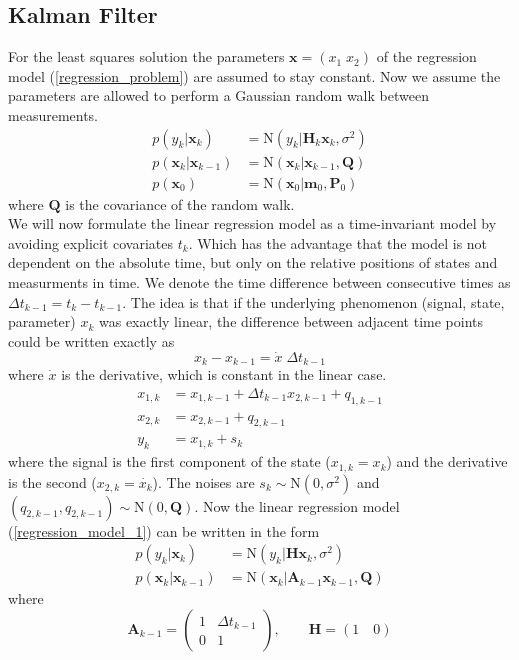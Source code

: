 \subsection{Kalman Filter} \label{KF}
For the least squares solution the parameters
$\mathbf{x} = (x_{1} \; x_{2})$ of
the regression model (\ref{regression_problem}) are assumed to stay constant.
Now we assume the parameters are allowed to perform
a Gaussian random walk between measurements.
\begin{align*}
  p(y_k | \mathbf{x}_k) &= \text{N}(y_k | \mathbf{H}_k \mathbf{x}_k, \sigma^2) \\
  p(\mathbf{x}_k | \mathbf{x}_{k-1}) &= \text{N}(\mathbf{x}_k |
                               \mathbf{x}_{k-1}, \mathbf{Q}) \\
  p(\mathbf{x}_0) &= \text{N}(\mathbf{x}_0 | \mathbf{m}_0, \mathbf{P}_0)
\end{align*}
where $\mathbf{Q}$ is the covariance of the random walk. \\
We will now formulate the
linear regression model as a time-invariant model
by avoiding explicit covariates $t_k$.
Which has the advantage that the model is not dependent on
the absolute time, but only on the relative positions of states
and measurments in time.
We denote the time difference between consecutive times as
$\Delta t_{k-1} = t_k - t_{k-1}$. The idea is that if
the underlying phenomenon (signal, state, parameter) $x_k$ was
exactly linear, the difference between adjacent time points could be
written exactly as
$$ x_k - x_{k-1} = \dot{x} \; \Delta t_{k-1} $$
where $\dot{x}$ is the derivative, which is constant in the linear case.
\begin{align*}
  x_{1,k} &= x_{1,k-1} + \Delta t_{k-1} x_{2,k-1} + q_{1,k-1} \\
  x_{2,k} &= x_{2,k-1} + q_{2,k-1} \\
  y_k &= x_{1,k} + s_k
\end{align*}
where the signal is the first component of the state
($x_{1,k} = x_k$) and the derivative is the second
($x_{2,k} = \dot{x_k}$).
The noises are $s_k \sim \text{N}(0, \sigma^2)$ and
$(q_{2,k-1}, q_{2,k-1}) \sim \text{N}(0,\mathbf{Q})$.
Now the linear regression model (\ref{regression_model_1}) can be written
in the form
\begin{align*}
  p(y_k | \mathbf{x}_k) &= \text{N}(y_k | \mathbf{H}
                          \mathbf{x}_k, \sigma^2) \\
  p(\mathbf{x}_k | \mathbf{x}_{k-1}) &= \text{N}(\mathbf{x}_k |
                                       \mathbf{A}_{k-1} \mathbf{x}_{k-1},
                                       \mathbf{Q})
\end{align*}
where
$$
\mathbf{A}_{k-1} =
\begin{pmatrix}
  1 & \Delta t_{k-1} \\
  0 & 1
\end{pmatrix}, \quad \quad \mathbf{H} = (1 \quad 0)
$$


